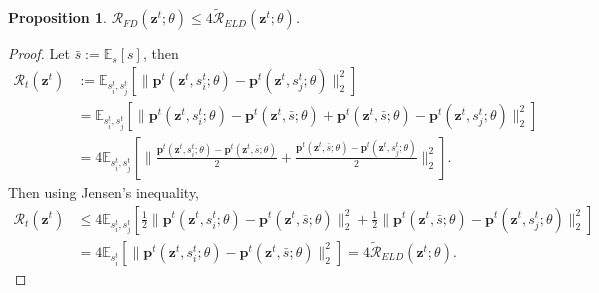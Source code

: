 \documentclass{article} \usepackage{iclr2018_conference,times}
\newtheorem{proposition}{Proposition}
\begin{document}
\begin{proposition}
$\mathcal{R}_{FD}(\mathbf{z}^{t}; \theta) \leq 4 \mathcal{\tilde{R}}_{ELD}(\mathbf{z}^{t}; \theta)$.
\end{proposition}
\begin{proof}
Let $\bar{s} := \mathbb{E}_{s}[s]$, then
\begin{align}
\mathcal{R}_t(\mathbf{z}^t) &:= \mathbb{E}_{s_i^t, s_j^t} \left[ \lVert \mathbf{p}^t(\mathbf{z}^t, s_i^t; \theta) - \mathbf{p}^t(\mathbf{z}^t, s_j^t; \theta) \rVert^2_2 \right] \\
&= \mathbb{E}_{s_i^t, s_j^t} \left[ \lVert \mathbf{p}^t(\mathbf{z}^t, s_i^t; \theta) -\mathbf{p}^t(\mathbf{z}^t, \bar{s}; \theta) + \mathbf{p}^t(\mathbf{z}^t, \bar{s}; \theta) - \mathbf{p}^t(\mathbf{z}^t, s_j^t; \theta) \rVert^2_2 \right]\\
&= 4 \mathbb{E}_{s_i^t, s_j^t} \left[ \lVert \frac{\mathbf{p}^t(\mathbf{z}^t, s_i^t; \theta) -\mathbf{p}^t(\mathbf{z}^t, \bar{s}; \theta)}{2} + \frac{\mathbf{p}^t(\mathbf{z}^t, \bar{s}; \theta) - \mathbf{p}^t(\mathbf{z}^t, s_j^t; \theta)}{2} \rVert^2_2 \right].
\end{align}
Then using Jensen's inequality,
\begin{align}
\mathcal{R}_t(\mathbf{z}^t)  &\leq 4\mathbb{E}_{s_i^t, s_j^t} \left[ \frac{1}{2} \lVert \mathbf{p}^t(\mathbf{z}^t, s_i^t; \theta) -\mathbf{p}^t(\mathbf{z}^t, \bar{s}; \theta) \rVert^2_2 + \frac{1}{2} \lVert \mathbf{p}^t(\mathbf{z}^t, \bar{s}; \theta) - \mathbf{p}^t(\mathbf{z}^t, s_j^t; \theta) \rVert^2_2 \right]\\
&=  4\mathbb{E}_{s_i^t} \left[ \lVert \mathbf{p}^t(\mathbf{z}^t, s_i^t; \theta)- \mathbf{p}^t(\mathbf{z}^t, \bar{s}; \theta)  \rVert^2_2 \right] = 4 \mathcal{\tilde{R}}_{ELD}(\mathbf{z}^{t}; \theta).
\end{align}
\end{proof}
\end{document}
